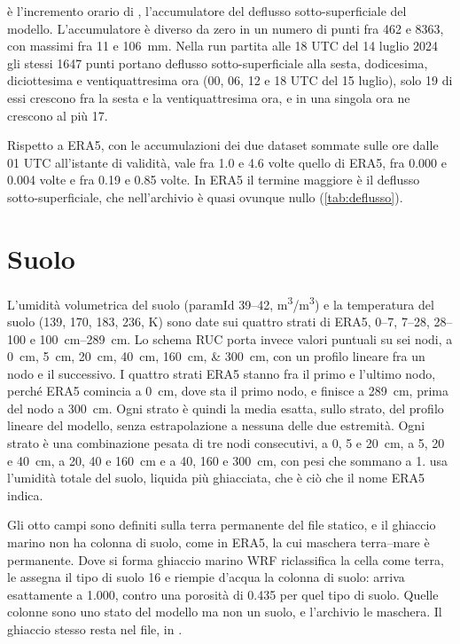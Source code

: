 è l'incremento orario di , l'accumulatore del deflusso sotto-superficiale
del modello. L'accumulatore è diverso da zero in un numero di punti fra 462 e
\num{8363}, con massimi fra 11 e \SI{106}{mm}. Nella run partita alle 18 UTC del 14 luglio 2024 gli
stessi \num{1647} punti portano deflusso sotto-superficiale alla sesta, dodicesima, diciottesima e
ventiquattresima ora (00, 06, 12 e 18 UTC del 15 luglio), solo 19 di essi crescono fra la sesta e la
ventiquattresima ora, e in una singola ora ne crescono al più 17.

Rispetto a ERA5, con le accumulazioni dei due dataset sommate sulle
ore dalle 01 UTC all'istante di validità,  vale fra \num{1.0} e \num{4.6} volte quello di ERA5,  fra
\num{0.000} e \num{0.004} volte e  fra \num{0.19} e \num{0.85} volte. In ERA5 il termine
maggiore è il deflusso sotto-superficiale, che nell'archivio è quasi ovunque nullo
(\cref{tab:deflusso}).

\section{Suolo}
\label{sec:suolo}

L'umidità volumetrica del suolo  (paramId 39--42, \si{m^3/m^3}) e la temperatura del
suolo  (139, 170, 183, 236, \si{K}) sono date sui quattro strati di ERA5, 0--7, 7--28,
28--100 e \SIrange{100}{289}{cm}. Lo schema RUC porta invece valori puntuali su sei nodi, a
\SIlist{0;5;20;40;160;300}{cm}, con un profilo lineare fra un nodo e il successivo. I quattro strati
ERA5 stanno fra il primo e l'ultimo nodo, perché ERA5 comincia a \SI{0}{cm}, dove sta il primo nodo,
e finisce a \SI{289}{cm}, prima del nodo a \SI{300}{cm}. Ogni strato è quindi la media esatta, sullo
strato, del profilo lineare del modello, senza estrapolazione a nessuna delle due estremità. Ogni
strato è una combinazione pesata di tre nodi consecutivi, a 0, 5 e \SI{20}{cm}, a 5, 20 e
\SI{40}{cm}, a 20, 40 e \SI{160}{cm} e a 40, 160 e \SI{300}{cm}, con pesi che sommano a 1.
 usa l'umidità totale del suolo, liquida più ghiacciata, che è ciò che il nome ERA5
indica.

Gli otto campi sono definiti sulla terra permanente del file statico, e il ghiaccio marino non ha
colonna di suolo, come in ERA5, la cui maschera terra--mare è permanente. Dove si forma ghiaccio
marino WRF riclassifica la cella come terra, le assegna il tipo di suolo 16 e riempie d'acqua la
colonna di suolo:  arriva esattamente a \num{1.000}, contro una porosità di \num{0.435}
per quel tipo di suolo. Quelle colonne sono uno stato del modello ma non un suolo, e l'archivio le
maschera. Il ghiaccio stesso resta nel file, in .

